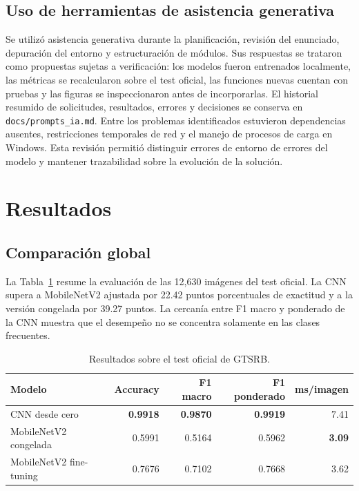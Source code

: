 \documentclass[11pt,letterpaper]{article}
\begin{document}
\subsection{Uso de herramientas de asistencia generativa}

Se utiliz\'o asistencia generativa durante la planificaci\'on, revisi\'on del enunciado, depuraci\'on del entorno y estructuraci\'on de m\'odulos. Sus respuestas se trataron como propuestas sujetas a verificaci\'on: los modelos fueron entrenados localmente, las m\'etricas se recalcularon sobre el test oficial, las funciones nuevas cuentan con pruebas y las figuras se inspeccionaron antes de incorporarlas. El historial resumido de solicitudes, resultados, errores y decisiones se conserva en \texttt{docs/prompts\_ia.md}. Entre los problemas identificados estuvieron dependencias ausentes, restricciones temporales de red y el manejo de procesos de carga en Windows. Esta revisi\'on permiti\'o distinguir errores de entorno de errores del modelo y mantener trazabilidad sobre la evoluci\'on de la soluci\'on.

\section{Resultados}

\subsection{Comparaci\'on global}

La Tabla~\ref{tab:resultados} resume la evaluaci\'on de las 12,630 im\'agenes del test oficial. La CNN supera a MobileNetV2 ajustada por 22.42 puntos porcentuales de exactitud y a la versi\'on congelada por 39.27 puntos. La cercan\'ia entre F1 macro y ponderado de la CNN muestra que el desempe\~no no se concentra solamente en las clases frecuentes.

\begin{table}[H]
    \centering
    \caption{Resultados sobre el test oficial de GTSRB.}
    \label{tab:resultados}
    \begin{tabular}{lrrrr}
        \toprule
        Modelo & Accuracy & F1 macro & F1 ponderado & ms/imagen \\
        \midrule
        CNN desde cero & \textbf{0.9918} & \textbf{0.9870} & \textbf{0.9919} & 7.41 \\
        MobileNetV2 congelada & 0.5991 & 0.5164 & 0.5962 & \textbf{3.09} \\
        MobileNetV2 fine-tuning & 0.7676 & 0.7102 & 0.7668 & 3.62 \\
        \bottomrule
    \end{tabular}
\end{table}
\end{document}
